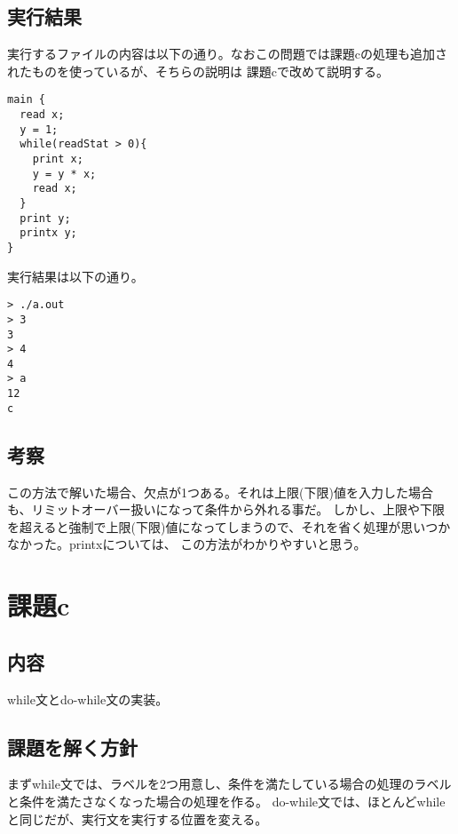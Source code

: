\documentclass[a4paper,11pt]{jarticle}
\begin{document}
\subsection{実行結果}
実行するファイルの内容は以下の通り。なおこの問題では課題cの処理も追加されたものを使っているが、そちらの説明は
課題cで改めて説明する。\\
\begin{verbatim}
main {
  read x;
  y = 1;
  while(readStat > 0){
    print x;
    y = y * x;
    read x;
  }
  print y;
  printx y;
}
\end{verbatim}
実行結果は以下の通り。\\
\begin{verbatim}
> ./a.out
> 3
3
> 4
4
> a
12
c
\end{verbatim}
\subsection{考察}
この方法で解いた場合、欠点が1つある。それは上限(下限)値を入力した場合も、リミットオーバー扱いになって条件から外れる事だ。
しかし、上限や下限を超えると強制で上限(下限)値になってしまうので、それを省く処理が思いつかなかった。printxについては、
この方法がわかりやすいと思う。\\
\section{課題c}
\subsection{内容}
while文とdo-while文の実装。\\
\subsection{課題を解く方針}
まずwhile文では、ラベルを2つ用意し、条件を満たしている場合の処理のラベルと条件を満たさなくなった場合の処理を作る。
do-while文では、ほとんどwhileと同じだが、実行文を実行する位置を変える。\\
\end{document}
